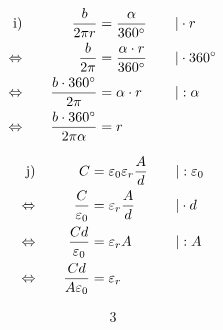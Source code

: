 \begin{exercise}
\begin{minipage}[t]{0.51\linewidth}
\begin{alignat*}{3}
        &
        \quad&\relax
      \end{alignat*}
    \end{minipage}\par
    \begin{minipage}[t]{0.47\linewidth}
      \makeatletter\@fleqntrue\makeatother
      \begin{alignat*}{3}
        \text{i)}&\quad
        &
        \frac{b}{2\pi r}&=\frac{\alpha}{360^{\circ}}
        &
        \quad&|\cdot r
        \\
        \Leftrightarrow&\quad
        &
        \frac{b}{2\pi}&=\frac{\alpha\cdot r}{360^{\circ}}
        &
        \quad&|\cdot360^\circ
        \\
        \Leftrightarrow&\quad
        &
        \frac{b\cdot360^\circ}{2\pi}&=\alpha\cdot r
        &
        \quad&|:\alpha
        \\
        \Leftrightarrow&\quad
        &
        \frac{b\cdot360^\circ}{2\pi\alpha}&=r
        &
        \quad&\relax
      \end{alignat*}
    \end{minipage}\hfill
    \begin{minipage}[t]{0.51\linewidth}
      \makeatletter\@fleqntrue\makeatother
      \begin{alignat*}{3}
        \text{j)}&\quad
        &
        C&=\varepsilon_{0}\varepsilon_{r}\frac{A}{d}
        &
        \quad&|:\varepsilon_{0}
        \\
        \Leftrightarrow&\quad
        &
        \frac{C}{\varepsilon_{0}}&=\varepsilon_{r}\frac{A}{d}
        &
        \quad&|\cdot d
        \\
        \Leftrightarrow&\quad
        &
        \frac{Cd}{\varepsilon_{0}}&=\varepsilon_{r}A
        &
        \quad&|:A
        \\
        \Leftrightarrow&\quad
        &
        \frac{Cd}{A\varepsilon_{0}}&=\varepsilon_{r}
        &
        \quad&\relax
      \end{alignat*}
    \end{minipage}\par
    \begin{minipage}[t]{0.47\linewidth}
      \makeatletter\@fleqntrue\makeatother
      \begin{alignat*}{3}

\end{alignat*}
\end{minipage}
\end{exercise}
